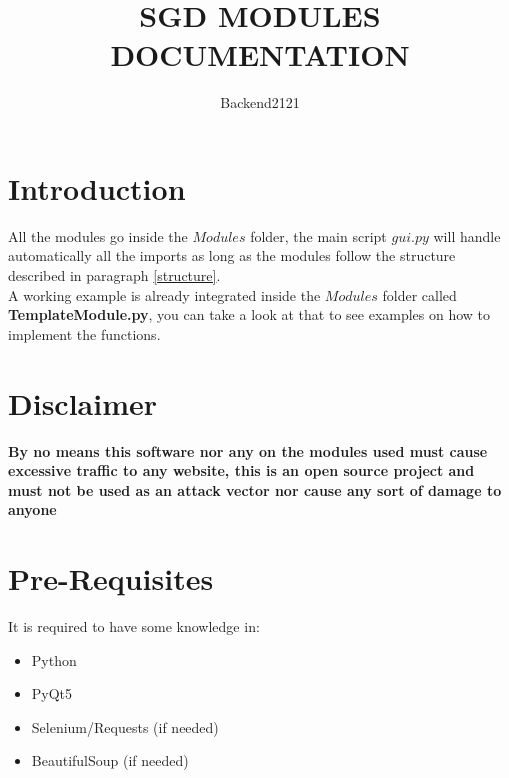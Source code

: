\documentclass{article}
\title{\textbf{SGD MODULES DOCUMENTATION}}
\author{Backend2121}
\begin{document}
\maketitle
\section{Introduction}
All the modules go inside the $Modules$ folder, the main script $gui.py$ will handle automatically all the imports as long as the modules follow the structure described in paragraph \ref{structure}. \\
A working example is already integrated inside the $Modules$ folder called \\ \textbf{TemplateModule.py}, you can take a look at that to see examples on how to implement the functions.

\section{Disclaimer}
\textbf{By no means this software nor any on the modules used must cause excessive traffic to any website, this is an open source project and must not be used as an attack vector nor cause any sort of damage to anyone}

\section{Pre-Requisites} \label{Pre}
    It is required to have some knowledge in:
    \begin{itemize}
        \item Python
        \item PyQt5
        \item Selenium/Requests (if needed)
        \item BeautifulSoup (if needed)
    \end{itemize}
\break
\end{document}
